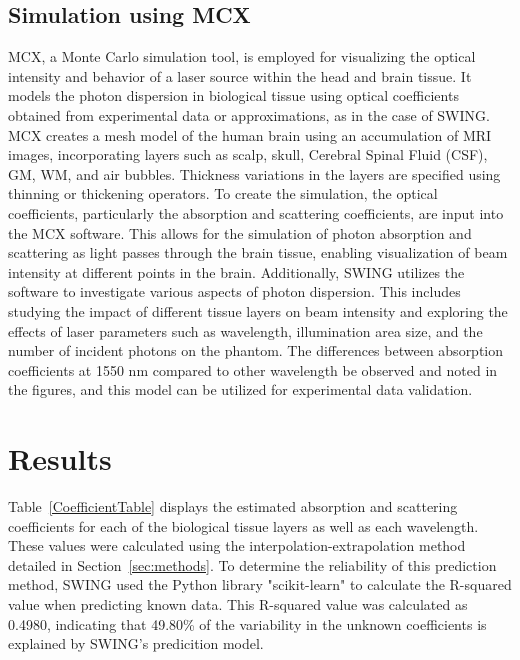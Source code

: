 \documentclass[journal,twoside,web]{ieeecolor}
\begin{document}

\subsection{Simulation using MCX}
MCX, a Monte Carlo simulation tool, is employed for visualizing the optical intensity and behavior of a laser source within the head and brain tissue. It models the photon dispersion in biological tissue using optical 
coefficients obtained from experimental data or approximations, as in the case of SWING. MCX creates a mesh model of the human brain using an accumulation of MRI images, incorporating layers such as scalp, skull, Cerebral Spinal Fluid (CSF), GM, WM, and air bubbles. Thickness variations in the layers are specified using thinning or thickening operators.
To create the simulation, the optical coefficients, particularly the absorption and scattering coefficients, are input into the MCX software. This allows for the simulation of photon absorption and scattering as light passes through the brain tissue, enabling visualization of beam intensity at different points in the brain.
Additionally, SWING utilizes the software to investigate various aspects of photon dispersion. This includes studying the impact of different tissue layers on beam intensity and exploring the effects of laser parameters such as wavelength, illumination area size, and the number of incident photons on the phantom.  The differences between absorption coefficients at 1550 nm compared to other wavelength be observed and noted in the figures, and this model can be utilized for experimental data validation.

\section{Results}
\label{sec:results}

Table~\ref{CoefficientTable} displays the estimated absorption and scattering coefficients for each of the biological tissue layers as well as each wavelength.
These values were calculated using the interpolation-extrapolation method detailed in Section~\ref{sec:methods}. To determine the reliability of this prediction method, SWING used
the Python library "scikit-learn" to calculate the R-squared value when predicting known data. This R-squared value was calculated as 0.4980, indicating that 49.80\% of the 
variability in the unknown coefficients is explained by SWING's predicition model.
\end{document}

